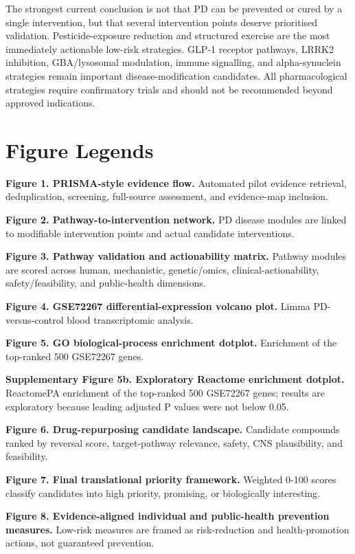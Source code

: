 \documentclass{article}
\begin{document}
The strongest current conclusion is not that PD can be prevented or cured by a single intervention, but that several intervention points deserve prioritised validation. Pesticide-exposure reduction and structured exercise are the most immediately actionable low-risk strategies. GLP-1 receptor pathways, LRRK2 inhibition, GBA/lysosomal modulation, immune signalling, and alpha-synuclein strategies remain important disease-modification candidates. All pharmacological strategies require confirmatory trials and should not be recommended beyond approved indications.


\section{Figure Legends}

\textbf{Figure 1. PRISMA-style evidence flow.} Automated pilot evidence retrieval, deduplication, screening, full-source assessment, and evidence-map inclusion.


\textbf{Figure 2. Pathway-to-intervention network.} PD disease modules are linked to modifiable intervention points and actual candidate interventions.


\textbf{Figure 3. Pathway validation and actionability matrix.} Pathway modules are scored across human, mechanistic, genetic/omics, clinical-actionability, safety/feasibility, and public-health dimensions.


\textbf{Figure 4. GSE72267 differential-expression volcano plot.} Limma PD-versus-control blood transcriptomic analysis.


\textbf{Figure 5. GO biological-process enrichment dotplot.} Enrichment of the top-ranked 500 GSE72267 genes.


\textbf{Supplementary Figure 5b. Exploratory Reactome enrichment dotplot.} ReactomePA enrichment of the top-ranked 500 GSE72267 genes; results are exploratory because leading adjusted P values were not below 0.05.


\textbf{Figure 6. Drug-repurposing candidate landscape.} Candidate compounds ranked by reversal score, target-pathway relevance, safety, CNS plausibility, and feasibility.


\textbf{Figure 7. Final translational priority framework.} Weighted 0-100 scores classify candidates into high priority, promising, or biologically interesting.


\textbf{Figure 8. Evidence-aligned individual and public-health prevention measures.} Low-risk measures are framed as risk-reduction and health-promotion actions, not guaranteed prevention.
\end{document}
